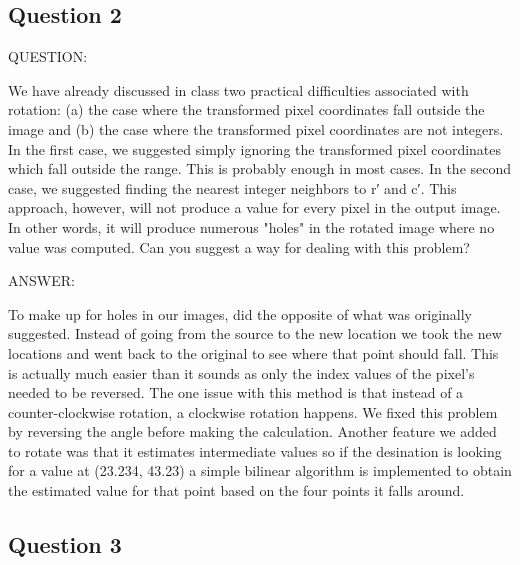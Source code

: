 \documentclass[pdftex, 11pt]{article}
\begin{document}
	\subsection{Question 2}	

		\begin{description}

			\item{QUESTION:}

				We have already discussed in class two practical difficulties associated with rotation: (a) the
				case where the transformed pixel coordinates fall outside the image and (b) the case
				where the transformed pixel coordinates are not integers. In the first case, we suggested simply
				ignoring the transformed pixel coordinates which fall outside the range. This is probably enough
				in most cases. In the second case, we suggested finding the nearest integer neighbors to r′ and c′.
				This approach, however, will not produce a value for every pixel in the output image. In other
				words, it will produce numerous "holes" in the rotated image where no value was computed. Can
				you suggest a way for dealing with this problem?

			\item{ANSWER:}

				To make up for holes in our images, did the opposite of what was originally suggested.  Instead of
				going from the source to the new location we took the new locations and went back to the original
				to see where that point should fall.  This is actually much easier than it sounds as only the
				index values of the pixel's needed to be reversed.  The one issue with this method is that instead
				of a counter-clockwise rotation, a clockwise rotation happens.  We fixed this problem by reversing
				the angle before making the calculation.  Another feature we added to rotate was that it estimates
				intermediate values so if the desination is looking for a value at (23.234, 43.23) a simple
				bilinear algorithm is implemented to obtain the estimated value for that point based on the four
				points it falls around.

		\end{description}

	\subsection{Question 3}	
\end{document}
